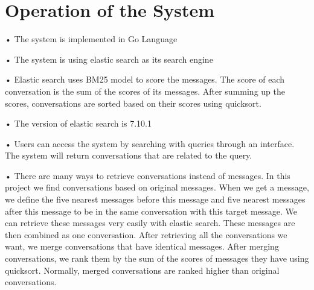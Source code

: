 \section{Operation of the System}

•	The system is implemented in Go Language

•	The system is using elastic search as its search engine

•	Elastic search uses BM25 model to score the messages. The score of each conversation is the sum of the scores of its messages. After summing up the scores, conversations are sorted based on their scores using quicksort.

•	The version of elastic search is 7.10.1

•	Users can access the system by searching with queries through an interface. The system will return conversations that are related to the query.


•	There are many ways to retrieve conversations instead of messages. In this project we find conversations based on original messages. When we get a message, we define the five nearest messages before this message and five nearest messages after this message to be in the same conversation with this target message. We can retrieve these messages very easily with elastic search. These messages are then combined as one conversation. After retrieving all the conversations we want, we merge conversations that have identical messages. After merging conversations, we rank them by the sum of the scores of messages they have using quicksort. Normally, merged conversations are ranked higher than original conversations.

